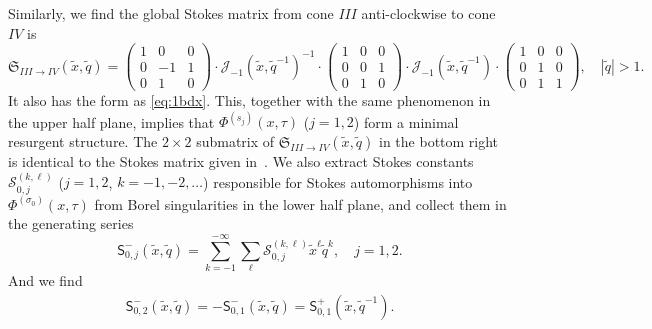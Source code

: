 \documentclass[12pt,reqno]{amsart}
\theoremstyle{definition}
\def\s{\sigma}
\def\tq{\tilde{q}}
\def\tx{\tilde{x}}
\def\tx{\tilde{x}}
\def\mc{\mathcal}
\def\mf{\mathfrak}
\def\ms{\mathsf}
\begin{document}
Similarly, we find the global Stokes matrix from cone $III$
anti-clockwise to cone $IV$ is 
\begin{equation}
  \mf{S}_{III\rightarrow IV}(\tx,\tq) =
  \begin{pmatrix}
    1&0&0\\
    0&-1&1\\
    0&1&0
  \end{pmatrix}\cdot \mc{J}_{-1}(\tx,\tq^{-1})^{-1}\cdot
  \begin{pmatrix}
    1&0&0\\
    0&0&1\\
    0&1&0
  \end{pmatrix}
  \cdot \mc{J}_{-1}(\tx,\tq^{-1})\cdot
  \begin{pmatrix}
    1&0&0\\
    0&1&0\\
    0&1&1
  \end{pmatrix},\quad |\tq|>1.\label{eq:S34x}
\end{equation}
It also has the form as \eqref{eq:1bdx}. This, together with the same phenomenon in
the upper half plane, implies that $\Phi^{(s_j)}(x,\tau)$ ($j=1,2$) form a minimal
resurgent structure. The $2\times 2$ submatrix of
$\mf{S}_{III\rightarrow IV}(\tx,\tq)$ in the bottom right is identical
to the Stokes matrix given in~\cite{GGM:resurgent}.  We also extract
Stokes constants $\mc{S}_{0,j}^{(k,\ell)}$ ($j=1,2$, $k=-1,-2,\ldots$)
responsible for Stokes automorphisms into $\Phi^{(\s_0)}(x,\tau)$ from
Borel singularities in the lower half plane, and collect them in the
generating series
\begin{equation}
  \ms{S}^-_{0,j}(\tx,\tq) = \sum_{k=-1}^{-\infty}\sum_{\ell}
  \mc{S}_{0,j}^{(k,\ell)}\tx^\ell\tq^k,\quad j=1,2.
\end{equation}
And we find
\begin{align}
  \ms{S}_{0,2}^-(\tx,\tq) = -\ms{S}_{0,1}^-(\tx,\tq) = \ms{S}_{0,1}^+(\tx,\tq^{-1}).
\end{align}
\end{document}
